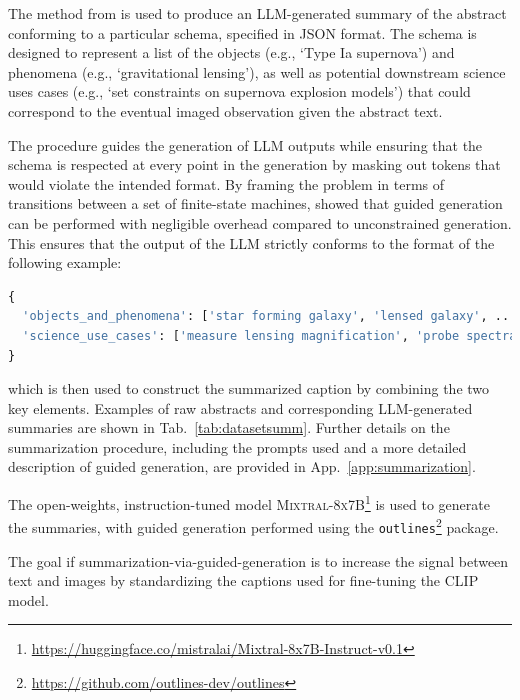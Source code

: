 \documentclass[10pt]{article} %
\newcommand{\datafolder}[1]{\def\thedatafolder{#1}}
\begin{document}
The method from \cite{willard2023efficient} is used to produce an LLM-generated summary of the abstract conforming to a particular schema, specified in JSON format. The schema is designed to represent a list of the objects (e.g., `Type Ia supernova') and phenomena (e.g., `gravitational lensing'), as well as potential downstream science uses cases (e.g., `set constraints on supernova explosion models') that could correspond to the eventual imaged observation given the abstract text.

The procedure guides the generation of LLM outputs while ensuring that the schema is respected at every point in the generation by masking out tokens that would violate the intended format. By framing the problem in terms of transitions between a set of finite-state machines, \cite{willard2023efficient} showed that guided generation can be performed with negligible overhead compared to unconstrained generation. This ensures that the output of the LLM strictly conforms to the format of the following example:
\begin{lstlisting}[language=Python]
{
  'objects_and_phenomena': ['star forming galaxy', 'lensed galaxy', ...], 
  'science_use_cases': ['measure lensing magnification', 'probe spectral energy distributions', ...]
}
\end{lstlisting}
which is then used to construct the summarized caption by combining the two key elements. Examples of raw abstracts and corresponding LLM-generated summaries are shown in Tab.~\ref{tab:datasetsumm}. Further details on the summarization procedure, including the prompts used and a more detailed description of guided generation, are provided in App.~\ref{app:summarization}.

The open-weights, instruction-tuned model \textsc{Mixtral-8x7B}\footnote{\url{https://huggingface.co/mistralai/Mixtral-8x7B-Instruct-v0.1}} is used to generate the summaries, with guided generation performed using the \texttt{outlines}\footnote{\url{https://github.com/outlines-dev/outlines}} package.

The goal if summarization-via-guided-generation is to increase the signal between text and images by standardizing the captions used for fine-tuning the CLIP model. 

\datafolder{./plots/data/}
 
\end{document}
